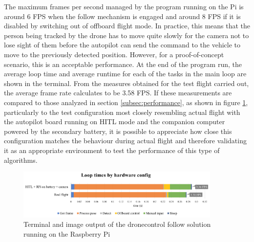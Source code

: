 The maximum frames per second managed by the program running on the Pi is around 6 FPS when the follow mechanism is engaged and around 8 FPS if it is disabled by switching out of offboard flight mode.
In practice, this means that the person being tracked by the drone has to move quite slowly for the camera not to lose sight of them before the autopilot can send the command to the vehicle to move to the previously detected position.
However, for a proof-of-concept scenario, this is an acceptable performance.
At the end of the program run, the average loop time and average runtime for each of the tasks in the main loop are shown in the terminal.
From the measures obtained for the test flight carried out, the average frame rate calculates to be 3.58 FPS.
If these measurements are compared to those analyzed in section \ref{subsec:performance}, as shown in figure \ref{fig:flight-performance}, particularly to the test configuration most closely resembling actual flight with the autopilot board running on HITL mode and the companion computer powered by the secondary battery, it is possible to appreciate how close this configuration matches the behaviour during actual flight and therefore validating it as an appropriate environment to test the performance of this type of algorithms.


\begin{figure}
  \centering
  \includegraphics[width=0.9\textwidth, keepaspectratio]{img/perf-hitl-flight.png}
  \caption{Terminal and image output of the dronecontrol follow solution running on the Raspberry Pi}
  \label{fig:flight-performance}
\end{figure}
